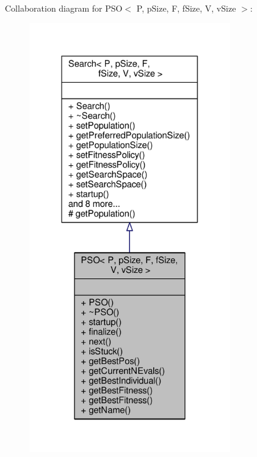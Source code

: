 Collaboration diagram for P\+SO$<$ P, p\+Size, F, f\+Size, V, v\+Size $>$\+:
\nopagebreak
\begin{figure}[H]
\begin{center}
\leavevmode
\includegraphics[width=247pt]{classPSO__coll__graph}
\end{center}
\end{figure}
